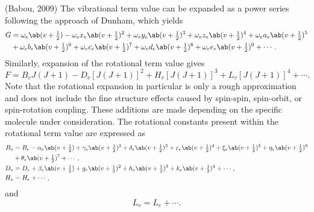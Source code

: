 \documentclass[11pt, twoside, fleqn]{report}
\begin{document}
    (Babou, 2009)
    The vibrational term value can be expanded as a power series following the approach of Dunham, which yields
    \begin{align*}
        G & = \omega_e\ab(v + \tfrac{1}{2}) - \omega_ex_e\ab(v + \tfrac{1}{2})^2 + \omega_ey_e\ab(v + \tfrac{1}{2})^3 + \omega_ez_e\ab(v + \tfrac{1}{2})^4 + \omega_ea_e\ab(v + \tfrac{1}{2})^5 \\
        & + \omega_eb_e\ab(v + \tfrac{1}{2})^6 + \omega_ec_e\ab(v + \tfrac{1}{2})^7 + \omega_ed_e\ab(v + \tfrac{1}{2})^8 + \omega_ee_e\ab(v + \tfrac{1}{2})^9 + \dotsb.
    \end{align*}
    Similarly, expansion of the rotational term value gives
    \begin{equation*}
        F = B_vJ(J + 1) - D_v[J(J + 1)]^2 + H_v[J(J + 1)]^3 + L_v[J(J + 1)]^4 + \dotsb.
    \end{equation*}
    Note that the rotational expansion in particular is only a rough approximation and does not include the fine structure effects caused by spin-spin, spin-orbit, or spin-rotation coupling. These additions are made depending on the specific molecule under consideration. The rotational constants present within the rotational term value are expressed as
    \begin{align*}
        B_v & = B_e - \alpha_e\ab(v + \tfrac{1}{2}) + \gamma_e\ab(v + \tfrac{1}{2})^2 + \delta_e\ab(v + \tfrac{1}{2})^3 + \varepsilon_e\ab(v + \tfrac{1}{2})^4 + \xi_e\ab(v + \tfrac{1}{2})^5 + \eta_e\ab(v + \tfrac{1}{2})^6 \\
        & + \theta_e\ab(v + \tfrac{1}{2})^7 + \dotsb,                                                                                                                                                                                         \\
        D_v & = D_e + \beta_e\ab(v + \tfrac{1}{2}) + g_e\ab(v + \tfrac{1}{2})^2 + h_e\ab(v + \tfrac{1}{2})^3 + k_e\ab(v + \tfrac{1}{2})^4 + \dotsb,                                                                                   \\
        H_v & = H_e + \dotsb,
    \end{align*}
    and
    \begin{equation*}
        L_v = L_e + \dotsb.
    \end{equation*}
\end{document}
